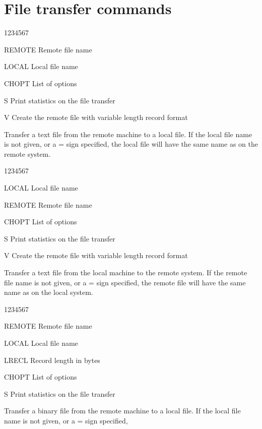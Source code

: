 \section{File transfer commands}
\begin{DLtt}{1234567}
\item[REMOTE]Remote file name
\item[LOCAL]Local file name
\item[CHOPT]List of options
\begin{DLtt}{12}
\item[S]Print statistics on the file transfer
\item[V]Create the remote file with variable length record format
\end{DLtt}
\end{DLtt}
Transfer a text file from the remote machine to a local file.
If the local file name is not given, or a = sign specified,
the local file will have the same name as on the remote system.
\begin{DLtt}{1234567}
\item[LOCAL]Local file name
\item[REMOTE]Remote file name
\item[CHOPT]List of options
\begin{DLtt}{12}
\item[S]Print statistics on the file transfer
\item[V]Create the remote file with variable length record format
\end{DLtt}
\end{DLtt}
Transfer a text file from the local machine to the remote system.
If the remote file name is not given, or a = sign specified,
the remote file will have the same name as on the local system.
\begin{DLtt}{1234567}
\item[REMOTE]Remote file name
\item[LOCAL]Local file name
\item[LRECL]Record length in bytes
\item[CHOPT]List of options
\begin{DLtt}{12}
\item[S]Print statistics on the file transfer
\end{DLtt}
\end{DLtt}
Transfer a binary file from the remote machine to a local file.
If the local file name is not given, or a = sign specified,
